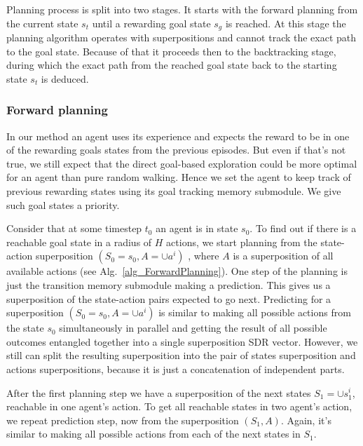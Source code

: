 \documentclass[a4paper,twoside]{article}
\begin{document}
Planning process is split into two stages. It starts with the forward planning from the current state $s_t$ until a rewarding goal state $s_g$ is reached. At this stage the planning algorithm operates with superpositions and cannot track the exact path to the goal state. Because of that it proceeds then to the backtracking stage, during which the exact path from the reached goal state back to the starting state $s_t$ is deduced.

\subsubsection{Forward planning}

In our method an agent uses its experience and expects the reward to be in one of the rewarding goals states from the previous episodes. But even if that's not true, we still expect that the direct goal-based exploration could be more optimal for an agent than pure random walking. Hence we set the agent to keep track of previous rewarding states using its goal tracking memory submodule. We give such goal states a priority.

Consider that at some timestep $t_0$ an agent is in state $s_0$. To find out if there is a reachable goal state in a radius of $H$ actions, we start planning from the state-action superposition $(S_0 = s_0, A = \cup a^i)$ \footnotemark, where $A$ is a superposition of all available actions (see Alg.~\ref{alg_ForwardPlanning}). One step of the planning is just the transition memory submodule making a prediction. This gives us a superposition of the state-action pairs expected to go next. Predicting for a superposition $(S_0 = s_0, A = \cup a^i)$ is similar to making all possible actions from the state $s_0$ simultaneously in parallel and getting the result of all possible outcomes entangled together into a single superposition SDR vector. However, we still can split the resulting superposition into the pair of states superposition and actions superpositions, because it is just a concatenation of independent parts.


After the first planning step we have a superposition of the next states $S_1 = \cup s_1^i$, reachable in one agent's action. To get all reachable states in two agent's action, we repeat prediction step, now from the superposition $(S_1, A)$. Again, it's similar to making all possible actions from each of the next states in $S_1$.
\end{document}
